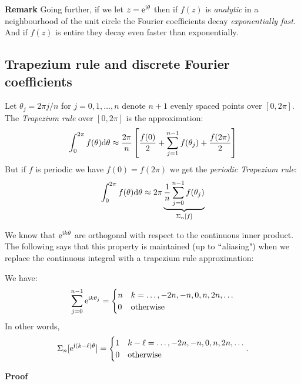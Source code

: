 \textbf{Remark} Going further, if we let $z = {\rm e}^{{\rm i} \ensuremath{\theta}}$ then if $f(z)$ is \emph{analytic} in a neighbourhood of the unit circle the Fourier coefficients decay \emph{exponentially fast}. And if $f(z)$ is entire they decay even faster than exponentially.

\subsection{Trapezium rule and discrete Fourier coefficients}
\begin{definition} Let $\ensuremath{\theta}_j = 2\ensuremath{\pi}j/n$ for $j = 0,1,\ensuremath{\ldots},n$ denote $n+1$ evenly spaced points over $[0,2\ensuremath{\pi}]$. The \emph{Trapezium rule} over $[0,2\ensuremath{\pi}]$ is the approximation:
\[
\ensuremath{\int}_0^{2\ensuremath{\pi}} f(\ensuremath{\theta}) {\rm d}\ensuremath{\theta} \ensuremath{\approx} {2 \ensuremath{\pi} \over n} \left[{f(0) \over 2} + \ensuremath{\sum}_{j=1}^{n-1} f(\ensuremath{\theta}_j) + {f(2 \ensuremath{\pi}) \over 2} \right]
\]
But if $f$ is periodic we have $f(0) = f(2\ensuremath{\pi})$ we get the \emph{periodic Trapezium rule}:
\[
\ensuremath{\int}_0^{2\ensuremath{\pi}} f(\ensuremath{\theta}) {\rm d}\ensuremath{\theta} \ensuremath{\approx} 2 \ensuremath{\pi}\underbrace{{1 \over n} \ensuremath{\sum}_{j=0}^{n-1} f(\ensuremath{\theta}_j)}_{\ensuremath{\Sigma}_n[f]}
\]
\end{definition}

We know that ${\rm e}^{{\rm i} k \ensuremath{\theta}}$ are orthogonal with respect to the continuous inner product. The following says that this property is maintained (up to \ensuremath{\ldq}aliasing") when we replace the continuous integral with a trapezium rule approximation:

\begin{lemma} We have:
\[
\ensuremath{\sum}_{j=0}^{n-1} {\rm e}^{{\rm i} k \ensuremath{\theta}_j} =
\begin{cases} n & k = \ldots,-2n,-n,0,n,2n,\ldots  \cr
              0 & \hbox{otherwise}
\end{cases}
\]
In other words,
\[
\ensuremath{\Sigma}_n[{\rm e}^{{\rm i} (k-\ensuremath{\ell}) \ensuremath{\theta}}] =
\begin{cases} 1 & k-\ensuremath{\ell} = \ldots,-2n,-n,0,n,2n,\ldots  \cr
              0 & \hbox{otherwise}
\end{cases}.
\]
\end{lemma}
\textbf{Proof}

